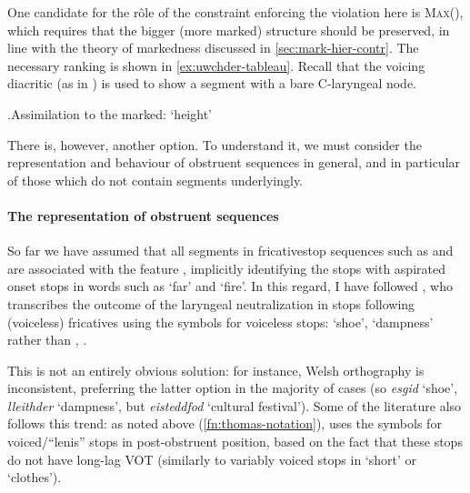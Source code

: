 One candidate for the rôle of the constraint enforcing the violation here is \textsc{Max}(), which requires that the bigger (\ie more marked) structure should be preserved, in line with the theory of markedness discussed in \cref{sec:mark-hier-contr}. The necessary ranking is shown in \ref{ex:uwchder-tableau}. Recall that the voicing diacritic (as in \ipa{[χ̬]}) is used to show a segment with a bare C-laryngeal node.

\ex.\label{ex:uwchder-tableau}Assimilation to the marked: \ipa{[ˈiuχter]} `height'\\

There is, however, another option. To understand it, we must consider the representation and behaviour of obstruent sequences in general, and in particular of those which do not contain  segments underlyingly.

\paragraph{The representation of obstruent sequences}
\label{sec:repr-obstr-sequ}

So far we have assumed that all segments in fricative\endash stop sequences such as \ipa{[sp]} and \ipa{[χt]} are associated with the feature , implicitly identifying the stops with aspirated onset stops in words such as  `far' and  `fire'. In this regard, I have followed \citet{awbery86:_pembr_welsh}, who transcribes the outcome of the laryngeal neutralization in stops following (voiceless) fricatives using the symbols for voiceless stops: \ipa{[ˈeskid]} `shoe', \ipa{[ˈɬeiθter]} `dampness' rather than \ipa{[ˈesɡid]}, \ipa{[ˈɬeiθder]}.

This is not an entirely obvious solution: for instance, Welsh orthography is inconsistent, preferring the latter option in the majority of cases (so \emph{e\emph{sg}id} `shoe', \emph{llei\emph{thd}er} `dampness', but \emph{ei\emph{st}eddfod} `cultural festival'). Some of the literature also follows this trend: as noted above (\cref{fn:thomas-notation}), \citet{thomas93:_tafod_nantg} uses the symbols for voiced\fshyp\enquote{lenis} stops in post-obstruent position, based on the fact that these stops do not have long\hyp lag VOT (similarly to variably voiced stops in  `short' or  `clothes').

